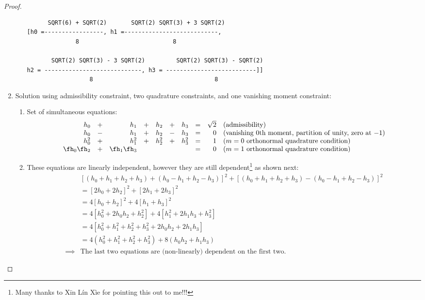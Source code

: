 \begin{proof}
\begin{enumerate}
\begin{enumerate}
{\begin{verbatim}
      SQRT(6) + SQRT(2)	      SQRT(2) SQRT(3) + 3 SQRT(2)
[h0 =-----------------, h1 =---------------------------, 
              8                           8

       SQRT(2) SQRT(3) - 3 SQRT(2)         SQRT(2) SQRT(3) - SQRT(2)
h2 = ----------------------------, h3 = --------------------------]]
                  8                                   8
\end{verbatim}
}
\end{enumerate}




\item Solution using admissibility constraint, two quadrature constraints, and one vanishing moment constraint:
\begin{enumerate}
\item Set of simultaneous equations:
\[\begin{array}{*{9}{r}l}
  h_0      &+& h_1      &+& h_2   &+& h_3   &=& \sqrt{2}      
  &\text{(admissibility)} 
  \\
  h_0      &-& h_1      &+& h_2   &-& h_3   &=& 0          
  &\text{(vanishing 0th moment, partition of unity, zero at $-1$)} 
  \\
  h_0^2    &+& h_1^2    &+& h_2^2 &+& h_3^2 &=& 1                  
  &\text{($m=0$ orthonormal quadrature condition)} 
  \\
  \fh_0\fh_2 &+& \fh_1\fh_3 & &         & &         &=& 0
  &\text{($m=1$ orthonormal quadrature condition)} 
\end{array}\]

\item These equations are linearly independent, however they are 
      still dependent\footnote{
        Many thanks to X\=in L\'in X\`ie for pointing this out to me!!!
        }
      as shown next:
  \begin{align*}
    &  [(h_0+h_1+h_2+h_3)+(h_0-h_1+h_2-h_3)]^2+[(h_0+h_1+h_2+h_3)-(h_0-h_1+h_2-h_3)]^2
  \\&= [2h_0+2h_2]^2+[2h_1+2h_3]^2
  \\&= 4[h_0+h_2]^2+4[h_1+h_3]^2
  \\&= 4[h_0^2+2h_0h_2+h_2^2]+4[h_1^2+2h_1h_3+h_3^2]
  \\&= 4[h_0^2 + h_1^2 + h_2^2 + h_3^2 + 2h_0h_2 + 2h_1h_3]
  \\&= 4(h_0^2 + h_1^2 + h_2^2 + h_3^2) + 8(h_0h_2 + h_1h_3)
  \\ \implies & \text{The last two equations are (non-linearly) dependent on the first two.}
  \end{align*}


\end{enumerate}
\end{enumerate}
\end{proof}
